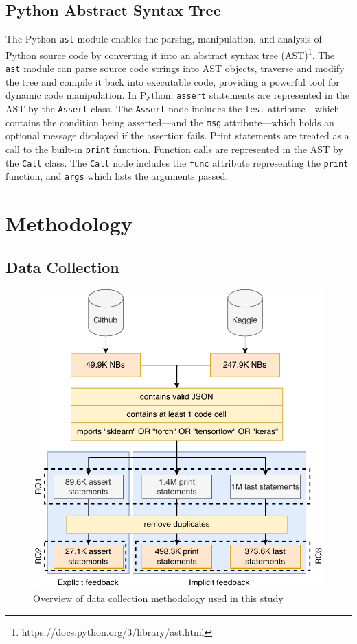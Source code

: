 \documentclass[smallextended]{svjour3}       %
\begin{document}
\subsection{Python Abstract Syntax Tree}

The Python \lstinline{ast} module enables the parsing, manipulation, and analysis of Python source code by converting it into an abstract syntax tree (AST)\footnote{https://docs.python.org/3/library/ast.html}. The \lstinline{ast} module can parse source code strings into AST objects, traverse and modify the tree and compile it back into executable code, providing a powerful tool for dynamic code manipulation. In Python, \lstinline{assert} statements are represented in the AST by the \lstinline{Assert} class. The \lstinline{Assert} node includes the \lstinline{test} attribute---which contains the condition being asserted---and the \lstinline{msg} attribute---which holds an optional message displayed if the assertion fails. Print statements are treated as a call to the built-in \lstinline{print} function. Function calls are represented in the AST by the \lstinline{Call} class. The \lstinline{Call} node includes the \lstinline{func} attribute representing the \lstinline{print} function, and \lstinline{args} which lists the arguments passed.

\section{Methodology}

\subsection{Data Collection}\label{sec:data-collect}

\begin{figure}
  \centering
  \includegraphics[width=0.75\linewidth]{data-collection.pdf}
  \caption{Overview of data collection methodology used in this study}
  \label{fig:data-collection}
\end{figure}
\end{document}
